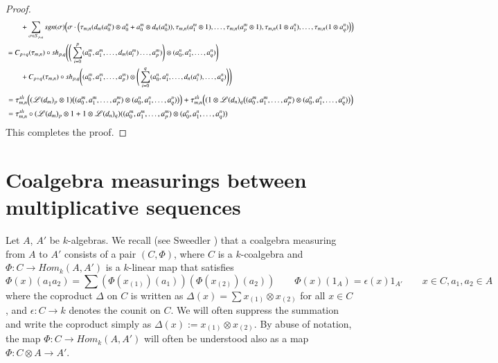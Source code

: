 \documentclass[10pt, colorlinks]{article}
\numberwithin{equation}{section} \DeclareMathSizes{2}{10}{12}{13}
\begin{document}
\begin{proof}
\begin{align}
           &\qquad+\sum_{\sigma\in S_{p,q}}sgn(\sigma)\Big(\sigma\cdot\Big(\tau_{m,n}(d_m(a^m_0)\otimes a_0^n+a^m_0\otimes d_n(a^n_0)),\tau_{m,n}(a^m_1\otimes 1),\ldots,\tau_{m,n}(a^m_p\otimes 1),\tau_{m,n}(1\otimes a^n_1),\ldots,\tau_{m,n}(1\otimes a^n_q)\Big)\Big)\notag\\
           &=C_{p+q}(\tau_{m,n})\circ sh_{p,q}\Bigg(\Bigg(\sum_{i=0}^{p}(a^m_0,a^m_1,\ldots,d_m(a^m_i)\ldots,a^m_p)\Bigg)\otimes(a^n_0,a^n_1,\ldots,a^n_q)\Bigg)\notag\\
           &\qquad+C_{p+q}(\tau_{m,n})\circ sh_{p,q}\Bigg((a^m_0,a^m_1,\ldots,a^m_p)\otimes \Bigg(\sum_{i=0}^{q}(a_0^n,a_1^n,\ldots,d_n(a_i^n),\ldots,a_q^n)\Bigg)\Bigg)\notag
           \end{align}
           \begin{align}
           &=\tau^{sh}_{m,n}\Big((\mathscr L(d_m)_{p}\otimes 1)\big((a^m_0,a^m_1,\ldots,a^m_p)\otimes(a^n_0,a^n_1,\ldots,a^n_q)\big)\Big)+\tau^{sh}_{m,n}\Big( (1\otimes\mathscr L(d_n)_{q}\big((a^m_0,a^m_1,\ldots,a^m_p)\otimes(a^n_0,a^n_1,\ldots,a^n_q)\big)\Big)\notag\\
           &=\tau^{sh}_{m,n}\circ(\mathscr L(d_m)_{p}\otimes1+1\otimes\mathscr L(d_n)_{q})((a^m_0,a^m_1,\ldots,a^m_p)\otimes(a^n_0,a^n_1,\ldots,a^n_q))\notag
      \end{align}
      This completes the proof.
    \end{proof}
    \section{Coalgebra measurings between multiplicative sequences}\label{section3}
    
       Let $A$, $A'$ be $k$-algebras. We recall (see Sweedler \cite{SW}) that a coalgebra measuring from $A$ to $A'$  consists of  a pair $(C,\Phi)$, where $C$ is a $k$-coalgebra and 
       $\Phi:C\longrightarrow  {Hom}_{k}(A,A')$ is a $k$-linear map that satisfies
    \begin{equation}\label{eq3.1}
        \Phi(x)(a_1a_2)=\sum(\Phi(x_{(1)})(a_1))(\Phi(x_{(2)})(a_2))\qquad\Phi(x)(1_A)=\epsilon(x)1_{A'} \qquad x\in C, a_1,a_2\in A
    \end{equation} where   the coproduct $\Delta$ on $C$ is written as $\Delta(x)=\sum x_{(1)}\otimes x_{(2)}$ for all $x\in C$, and $\epsilon:C\longrightarrow k$ denotes the counit on
    $C$. We will often suppress the summation and write the coproduct simply as $\Delta(x):=x_{(1)}\otimes x_{(2)}$. By abuse of notation, the map  $\Phi:C\longrightarrow  {Hom}_{k}(A,A')$ will often be understood also as a map $\Phi:C\otimes A\longrightarrow A'$. 
    
\end{document}
